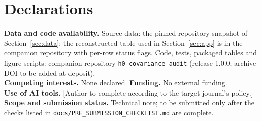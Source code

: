 \documentclass[11pt,a4paper]{article}
\theoremstyle{remark}\newtheorem{remark}{Remark}
\begin{document}
\section*{Declarations}
\noindent\textbf{Data and code availability.} Source data: the pinned repository snapshot of Section~\ref{sec:data}; the reconstructed table used in Section~\ref{sec:app} is in the companion repository with per-row status flags. Code, tests, packaged tables and figure scripts: companion repository \texttt{h0-covariance-audit} (release 1.0.0; archive DOI to be added at deposit).\\
\textbf{Competing interests.} None declared. \textbf{Funding.} No external funding.\\
\textbf{Use of AI tools.} [Author to complete according to the target journal's policy.]\\
\textbf{Scope and submission status.} Technical note; to be submitted only after the checks listed in \texttt{docs/PRE\_SUBMISSION\_CHECKLIST.md} are complete.



\end{document}
